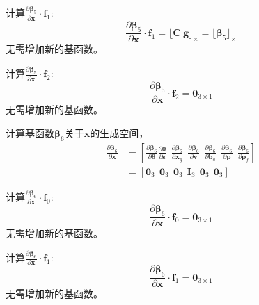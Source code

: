 \documentclass{article}
\begin{document}
\par
计算$\frac{\partial\mathbf{\beta}_5}{\partial\textbf{x}}\cdot\textbf{f}_1$:
\begin{equation}
    \frac{\partial\mathbf{\beta}_5}{\partial\textbf{x}}\cdot\textbf{f}_1
    =\lfloor\textbf{C}\ \textbf{g}\rfloor_{\times}
    =\lfloor\mathbf{\beta}_5\rfloor_{\times}
\end{equation}
无需增加新的基函数。

\par
计算$\frac{\partial\mathbf{\beta}_5}{\partial\textbf{x}}\cdot\textbf{f}_2$:
\begin{equation}
    \frac{\partial\mathbf{\beta}_5}{\partial\textbf{x}}\cdot\textbf{f}_2=\textbf{0}_{3\times 1}
\end{equation}
无需增加新的基函数。

\par
计算基函数$\mathbf{\beta}_6$关于$\textbf{x}$的生成空间，
\begin{equation}
    \begin{array}{ll}\frac{\partial\mathbf{\beta}_6}{\partial\textbf{x}}
        &=\left[\frac{\partial\mathbf{\beta}_6}{\partial\mathbf{\theta}}\frac{\partial\mathbf{\theta}}{\partial\textbf{s}}
        \ \ \frac{\partial\mathbf{\beta}_6}{\partial\textbf{x}_{g}}\ \ \frac{\partial\mathbf{\beta}_6}{\partial\textbf{v}}
        \ \ \frac{\partial\mathbf{\beta}_6}{\partial\textbf{b}_{a}}\ \ \frac{\partial\mathbf{\beta}_6}{\partial\textbf{p}}
        \ \ \frac{\partial\mathbf{\beta}_6}{\partial\textbf{p}_f}\right]\\
        &=\left[\textbf{0}_3\ \ \textbf{0}_3\ \ \textbf{0}_3\ \ \textbf{I}_3\ \ \textbf{0}_3\ \ \textbf{0}_3\right]
    \end{array}
\end{equation}

\par
计算$\frac{\partial\mathbf{\beta}_6}{\partial\textbf{x}}\cdot\textbf{f}_0$:
\begin{equation}
    \frac{\partial\mathbf{\beta}_6}{\partial\textbf{x}}\cdot\textbf{f}_0=\textbf{0}_{3\times 1}
\end{equation}
无需增加新的基函数。

\par
计算$\frac{\partial\mathbf{\beta}_6}{\partial\textbf{x}}\cdot\textbf{f}_1$:
\begin{equation}
    \frac{\partial\mathbf{\beta}_6}{\partial\textbf{x}}\cdot\textbf{f}_1=\textbf{0}_{3\times 1}
\end{equation}
无需增加新的基函数。
\end{document}

